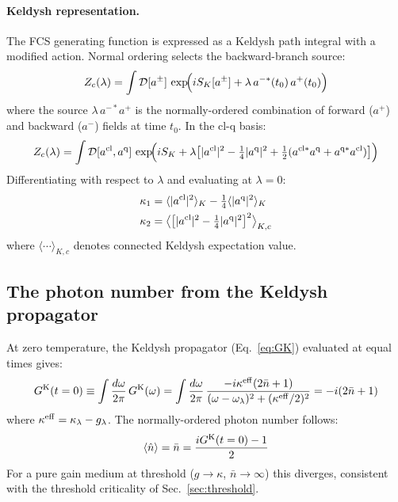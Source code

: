 \documentclass[12pt]{article}
\newcommand{\cl}{{\rm cl}}
\newcommand{\q}{{\rm q}}
\newcommand{\Keldysh}{{\rm K}}
\begin{document}
\paragraph{Keldysh representation.}
The FCS generating function is expressed as a Keldysh path integral
with a modified action.  Normal ordering selects the backward-branch
source:
\begin{equation}
  Z_c(\lambda) =
  \int\mathcal{D}[a^\pm]\,
  \exp\!\Bigl(iS_K[a^\pm]
  + \lambda\,a^{-*}(t_0)\,a^+(t_0)\Bigr)
  \label{eq:FCS_Keldysh}
\end{equation}
where the source $\lambda\,a^{-*}a^+$ is the normally-ordered combination
of forward ($a^+$) and backward ($a^-$) fields at time $t_0$.
In the cl-q basis:
\begin{equation}
  Z_c(\lambda) =
  \int\mathcal{D}[a^{\cl},a^\q]\,
  \exp\!\Bigl(iS_K
  + \lambda\bigl[|a^\cl|^2
  - \tfrac{1}{4}|a^\q|^2
  + \tfrac{1}{2}(a^{\cl*}a^\q+a^{\q*}a^\cl)\bigr]\Bigr)
  \label{eq:FCS_clq}
\end{equation}
Differentiating with respect to $\lambda$ and evaluating at $\lambda=0$:
\begin{align}
  \kappa_1 &= \langle|a^\cl|^2\rangle_K
  - \tfrac{1}{4}\langle|a^\q|^2\rangle_K
  \label{eq:kappa1_K}\\
  \kappa_2 &= \bigl\langle\bigl[|a^\cl|^2
  - \tfrac{1}{4}|a^\q|^2\bigr]^2\bigr\rangle_{K,c}
  \label{eq:kappa2_K}
\end{align}
where $\langle\cdots\rangle_{K,c}$ denotes connected Keldysh expectation
value.

\subsection{The photon number from the Keldysh propagator}
\label{sec:photon_number}

At zero temperature, the Keldysh propagator (Eq.~\ref{eq:GK}) evaluated
at equal times gives:
\begin{equation}
  G^\Keldysh(t=0) \equiv
  \int\frac{d\omega}{2\pi}\,G^\Keldysh(\omega) =
  \int\frac{d\omega}{2\pi}\,\frac{-i\kappa^{\rm eff}(2\bar{n}+1)}
  {(\omega-\omega_\lambda)^2+(\kappa^{\rm eff}/2)^2}
  = -i(2\bar{n}+1)
  \label{eq:GK_t0}
\end{equation}
where $\kappa^{\rm eff} = \kappa_\lambda - g_\lambda$.
The normally-ordered photon number follows:
\begin{equation}
  \langle\hat{n}\rangle =
  \bar{n} = \frac{iG^\Keldysh(t=0) - 1}{2}
  \label{eq:photon_number_K}
\end{equation}
For a pure gain medium at threshold ($g\to\kappa$, $\bar{n}\to\infty$)
this diverges, consistent with the threshold criticality of Sec.~\ref{sec:threshold}.
\end{document}
